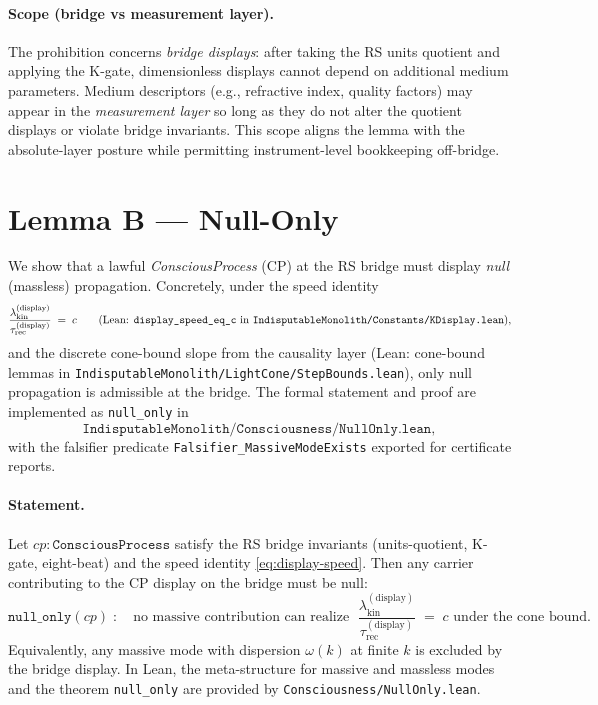 \documentclass[12pt,a4paper]{article}
\begin{document}
\paragraph{Scope (bridge vs measurement layer).}
The prohibition concerns \emph{bridge displays}: after taking the RS units quotient and applying the K-gate, dimensionless displays cannot depend on additional medium parameters. Medium descriptors (e.g., refractive index, quality factors) may appear in the \emph{measurement layer} so long as they do not alter the quotient displays or violate bridge invariants. This scope aligns the lemma with the absolute-layer posture while permitting instrument-level bookkeeping off-bridge.

\section{Lemma B — Null-Only}
\label{sec:lemmaB}

We show that a lawful \emph{ConsciousProcess} (CP) at the RS bridge must display \emph{null} (massless) propagation. Concretely, under the speed identity
\begin{equation}
  \frac{\lambda_{\mathrm{kin}}^{\mathrm{(display)}}}{\tau_{\mathrm{rec}}^{\mathrm{(display)}}} \;=\; c
  \qquad\text{(Lean: \texttt{display\_speed\_eq\_c} in \texttt{IndisputableMonolith/Constants/KDisplay.lean}),}
  \label{eq:display-speed}
\end{equation}
and the discrete cone-bound slope from the causality layer (Lean: cone-bound lemmas in \texttt{IndisputableMonolith/LightCone/StepBounds.lean}), only null propagation is admissible at the bridge. The formal statement and proof are implemented as \texttt{null\_only} in
\[
  \texttt{IndisputableMonolith/Consciousness/NullOnly.lean},
\]
with the falsifier predicate \texttt{Falsifier\_MassiveModeExists} exported for certificate reports.

\paragraph{Statement.}
Let \(cp:\texttt{ConsciousProcess}\) satisfy the RS bridge invariants (units-quotient, K-gate, eight-beat) and the speed identity \eqref{eq:display-speed}. Then any carrier contributing to the CP display on the bridge must be null:
\[
  \texttt{null\_only}(cp)\;:\quad
  \text{no massive contribution can realize }\;
  \frac{\lambda_{\mathrm{kin}}^{\mathrm{(display)}}}{\tau_{\mathrm{rec}}^{\mathrm{(display)}}} \;=\; c
  \text{ under the cone bound.}
\]
Equivalently, any massive mode with dispersion \(\omega(k)\) at finite \(k\) is excluded by the bridge display. In Lean, the meta-structure for massive and massless modes and the theorem \texttt{null\_only} are provided by \texttt{Consciousness/NullOnly.lean}.
\end{document}
